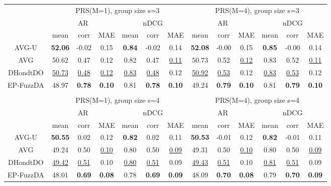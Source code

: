 \begin{tabular}{ c | c c c | c c c || c c c | c c c}

\multicolumn{1}{c}{} & \multicolumn{6}{c}{PRS(M=1), group size s=3} & \multicolumn{6}{c}{PRS(M=4), group size s=3} \\
\multicolumn{1}{c}{} & \multicolumn{3}{c}{AR} & \multicolumn{3}{c}{nDCG} & \multicolumn{3}{c}{AR} & \multicolumn{3}{c}{nDCG} \\
& mean & corr & MAE & mean & corr & MAE & mean & corr & MAE & mean & corr & MAE \\
\hline
AVG-U & \textbf{52.06} & -0.02 & 0.15 & \textbf{0.84} & -0.02 & 0.14 & \textbf{52.08} & -0.00 & 0.15 & \textbf{0.85} & -0.00 & 0.14 \\
AVG & 50.62 & 0.47 & 0.12 & 0.82 & 0.47 & \underline{0.11} & 50.73 & 0.52 & \underline{0.12} & 0.83 & 0.52 & \underline{0.11} \\
DHondtDO & \underline{50.73} & \underline{0.48} & \underline{0.12} & \underline{0.83} & \underline{0.48} & 0.12 & \underline{50.92} & \underline{0.53} & 0.12 & \underline{0.83} & \underline{0.53} & 0.12 \\
EP-FuzzDA & 48.97 & \textbf{0.78} & \textbf{0.10} & 0.81 & \textbf{0.78} & \textbf{0.10} & 49.24 & \textbf{0.79} & \textbf{0.10} & 0.81 & \textbf{0.79} & \textbf{0.10} \\

\multicolumn{12}{c}{} \\
\multicolumn{1}{c}{} & \multicolumn{6}{c}{PRS(M=1), group size s=4} & \multicolumn{6}{c}{PRS(M=4), group size s=4} \\
\multicolumn{1}{c}{} & \multicolumn{3}{c}{AR} & \multicolumn{3}{c}{nDCG} & \multicolumn{3}{c}{AR} & \multicolumn{3}{c}{nDCG} \\
& mean & corr & MAE & mean & corr & MAE & mean & corr & MAE & mean & corr & MAE \\
\hline
AVG-U & \textbf{50.55} & 0.02 & 0.12 & \textbf{0.82} & 0.02 & 0.11 & \textbf{50.53} & -0.01 & 0.12 & \textbf{0.82} & -0.01 & 0.11 \\
AVG & 49.24 & 0.50 & \underline{0.10} & 0.80 & 0.50 & \underline{0.09} & 49.31 & 0.50 & \underline{0.10} & 0.80 & 0.50 & \underline{0.09} \\
DHondtDO & \underline{49.42} & \underline{0.51} & 0.10 & \underline{0.80} & \underline{0.51} & 0.09 & \underline{49.43} & \underline{0.51} & 0.10 & \underline{0.81} & \underline{0.51} & 0.09 \\
EP-FuzzDA & 48.01 & \textbf{0.69} & \textbf{0.08} & 0.78 & \textbf{0.69} & \textbf{0.09} & 48.09 & \textbf{0.70} & \textbf{0.08} & 0.79 & \textbf{0.70} & \textbf{0.09} \\


\end{tabular}
